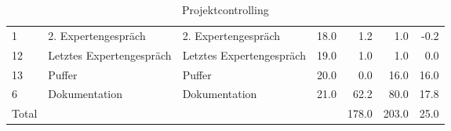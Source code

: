 \begin{table}[H]
{\begin{tabular}{llllrrr}
1 & 2. Expertengespräch & 2. Expertengespräch & 18.0 & 1.2 & 1.0 & -0.2 \\
12 & Letztes Expertengespräch & Letztes Expertengespräch & 19.0 & 1.0 & 1.0 & 0.0 \\
13 & Puffer & Puffer & 20.0 & 0.0 & 16.0 & 16.0 \\
6 & Dokumentation & Dokumentation & 21.0 & 62.2 & 80.0 & 17.8 \\
Total &  &  &  & 178.0 & 203.0 & 25.0 \\
\bottomrule
\end{tabular}
}
\caption{Projektcontrolling} \label{projektcontrolling}
\end{table}
